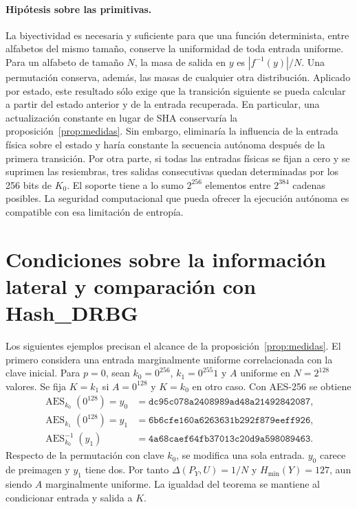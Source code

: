 \documentclass[11pt,a4paper]{article}
\newcommand{\Enc}{\operatorname{AES}}
\begin{document}
\paragraph{Hipótesis sobre las primitivas.}
La biyectividad es necesaria y suficiente para que una función determinista, entre alfabetos del mismo tamaño, conserve la uniformidad de toda entrada uniforme. Para un alfabeto de tamaño \(N\), la masa de salida en \(y\) es \(|f^{-1}(y)|/N\). Una permutación conserva, además, las masas de cualquier otra distribución. Aplicado por estado, este resultado sólo exige que la transición siguiente se pueda calcular a partir del estado anterior y de la entrada recuperada. En particular, una actualización constante en lugar de SHA conservaría la proposición~\ref{prop:medidas}. Sin embargo, eliminaría la influencia de la entrada física sobre el estado y haría constante la secuencia autónoma después de la primera transición. Por otra parte, si todas las entradas físicas se fijan a cero y se suprimen las resiembras, tres salidas consecutivas quedan determinadas por los 256 bits de \(K_0\). El soporte tiene a lo sumo \(2^{256}\) elementos entre \(2^{384}\) cadenas posibles. La seguridad computacional que pueda ofrecer la ejecución autónoma es compatible con esa limitación de entropía.

\section{Condiciones sobre la información lateral y comparación con Hash\_DRBG}
Los siguientes ejemplos precisan el alcance de la proposición~\ref{prop:medidas}. El primero considera una entrada marginalmente uniforme correlacionada con la clave inicial. Para \(p=0\), sean \(k_0=0^{256}\), \(k_1=0^{255}1\) y \(A\) uniforme en \(N=2^{128}\) valores. Se fija \(K=k_1\) si \(A=0^{128}\) y \(K=k_0\) en otro caso. Con AES-256 se obtiene
\begin{align*}
 \Enc_{k_0}(0^{128})=y_0&=\mathtt{dc95c078a2408989ad48a21492842087},\\
 \Enc_{k_1}(0^{128})=y_1&=\mathtt{6b6cfe160a6263631b292f879eeff926},\\
 \Enc^{-1}_{k_0}(y_1)&=\mathtt{4a68caef64fb37013c20d9a598089463}.
\end{align*}
Respecto de la permutación con clave \(k_0\), se modifica una sola entrada. \(y_0\) carece de preimagen y \(y_1\) tiene dos. Por tanto \(\Delta(P_Y,U)=1/N\) y \(H_{\min}(Y)=127\), aun siendo \(A\) marginalmente uniforme. La igualdad del teorema se mantiene al condicionar entrada y salida a \(K\).
\end{document}
